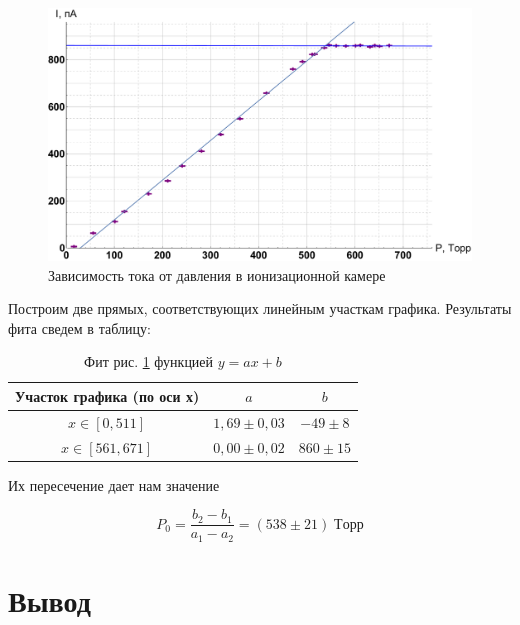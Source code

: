 \documentclass[12pt]{kiarticle}
\begin{document}
	
		\begin{figure}[h!]
		\includegraphics[scale=0.5]{graf_ion.pdf}
		\caption{Зависимость тока от давления в ионизационной камере}
				\label{graf_ion}
	\end{figure} 

	Построим две прямых, соответствующих линейным участкам графика. Результаты фита сведем в таблицу: 
	
	\begin{table}[H]
		\caption{Фит рис. \ref{graf_ion} функцией $ y = ax + b $} %
		\begin{center}
			\begin{tabular}{|c|c|c|}
				\hline
				Участок графика (по оси х) & $ a $ & $ b $ \\
				\hline
				 $ x \in [0, 511] $& $ 1,69 \pm 0,03 $  & $ -49 \pm 8 $ \\
				  $ x \in [561, 671] $ & $ 0,00 \pm 0,02 $ & $ 860 \pm 15  $\\
				\hline 
			\end{tabular} 
		\end{center}
		\label{compt_fit}
	\end{table}
	
	Их пересечение дает нам значение 
	
	\begin{equation}\label{}
	P_0 = \dfrac{b_2 - b_1}{a_1 - a_2} = (538 \pm 21) \; Торр
	\end{equation}
	
	
	
	
	\section{Вывод }
	
\end{document}
